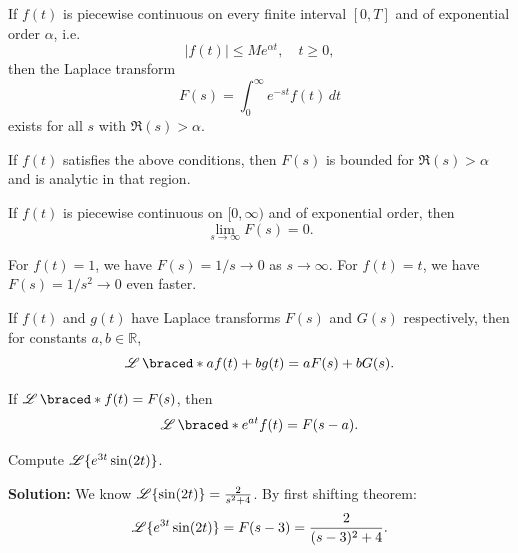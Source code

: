   \begin{marginfigure}
      
  \end{marginfigure}


  \begin{theorem}
    If $f(t)$ is piecewise continuous on every finite interval $[0,T]$ and of exponential order $\alpha$, i.e.
    \[
    |f(t)| \leq M e^{\alpha t}, \quad t \geq 0,
    \]
    then the Laplace transform
    \[
    F(s) = \int_0^\infty e^{-st} f(t)\, dt
    \]
    exists for all $s$ with $\Re(s) > \alpha$.
  \end{theorem}

  \begin{theorem}[Boundedness of $F(s)$]
    If $f(t)$ satisfies the above conditions, then $F(s)$ is bounded for $\Re(s) > \alpha$ and is analytic in that region.
  \end{theorem}

  \begin{theorem}
    If $f(t)$ is piecewise continuous on $[0,\infty)$ and of exponential order, then
    \[
    \lim_{s \to \infty} F(s) = 0.
    \]
  \end{theorem}

  \begin{example}
    For $f(t)=1$, we have $F(s)=1/s \to 0$ as $s \to \infty$.  
    For $f(t)=t$, we have $F(s)=1/s^2 \to 0$ even faster.  
  \end{example}


  \begin{theorem}
  If $f(t)$ and $g(t)$ have Laplace transforms $F(s)$ and $G(s)$ respectively, then for constants $a,b \in \mathbb{R}$,
  \[
  \laplace\braced*{af(t) + bg(t)} = aF(s) + bG(s).
  \]
  \end{theorem}


  \begin{theorem}
  If $\laplace\braced*{f(t)} = F(s)$, then
  \[
  \laplace\braced*{e^{at} f(t)} = F(s-a).
  \]
  \end{theorem}

  \begin{example}
    Compute $\operatorname{\mathscr{L}}\{e^{3t} \sin(2t)\}$.

    \textbf{Solution:}  
    We know $\operatorname{\mathscr{L}}\{\sin(2t)\} = \frac{2}{s^2 + 4}$. By first shifting theorem:
    \[
    \operatorname{\mathscr{L}}\{e^{3t}\sin(2t)\} = F(s-3) = \frac{2}{(s-3)^2 + 4}.
    \]
  \end{example}


